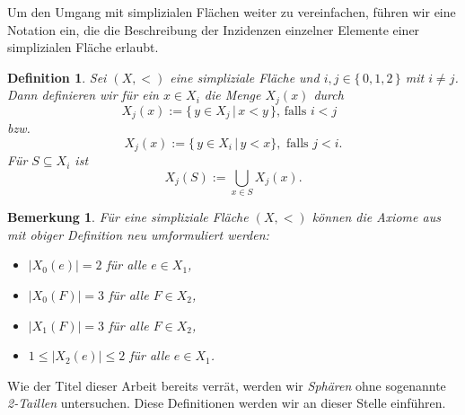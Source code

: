 \documentclass[12pt,titlepage,twoside,cleardoublepage]{article}
\theoremstyle{nummermitklammern}
\newtheorem{lemma}[temp]{Lemma}
\newtheorem{definition}[temp]{Definition}
\newtheorem{bemerkung}[temp]{Bemerkung}
\newtheorem{definition}[zahl]{Definition}
\newtheorem{lemma}[zahl]{Lemma}
\newtheorem{bemerkung}[zahl]{Bemerkung}
\numberwithin{equation}{section}
\begin{document}





Um den Umgang mit simplizialen Flächen weiter zu vereinfachen, führen wir eine Notation ein, die die Beschreibung der Inzidenzen einzelner Elemente einer simplizialen Fläche erlaubt.
\begin{definition} 
Sei $(X,<)$ eine simpliziale Fläche und $i,j \in \{\,0,1,2\,\}$ mit $i \neq j$. Dann definieren wir für ein $x \in X_{i}$ die Menge $X_j(x)$ durch
\[
X_{j}(x):=\{\,y \in X_{j}\,|\,x < y\,\} \text{, falls $i < j$  }
\]
bzw. 
\[
X_{j}(x):=\{\,y \in X_{i}\,|\,y < x\}, \text{ falls $j<i$}.
\]
Für $S \subseteq X_{i}$ ist 
\[
X_j(S):= \bigcup_{x\in S}X_{j}(x).
\]
\end{definition}
\begin{bemerkung}
Für eine simpliziale Fläche $(X,<)$ können die Axiome aus  mit obiger Definition neu umformuliert werden:
\begin{itemize}
\item $\vert X_{0}(e)\vert=2$ für alle $e \in X_{1}$,
\item $\vert X_{0}(F)\vert=3$ für alle $F \in X_{2}$,
\item $\vert X_{1}(F)\vert=3$ für alle $F \in X_{2}$,
\item $1\leq  \vert X_{2}(e)\vert \leq 2$ für alle $e \in X_{1}$.

\end{itemize}
\end{bemerkung}
Wie der Titel dieser Arbeit bereits verrät, werden wir \emph{Sphären} ohne sogenannte \emph{2-Taillen} untersuchen. Diese Definitionen werden wir an dieser Stelle einführen.
\end{document}
